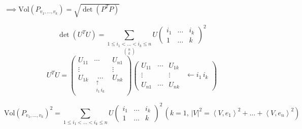 \emph{$\implies\text{Vol}\left(P_{v_1,\dots,v_k}\right)=\sqrt{\det\left(P^TP\right)}$}


\begin{theorem}
    $$\det\left(U^TU\right)=\sum_{\underset{\begin{pmatrix}n\\k\end{pmatrix}}{1\leq i_1<\dots<i_k\leq n}}U\begin{pmatrix}
            i_1 & \dots & i_k \\
            1   & \dots & k
        \end{pmatrix}^2$$
    \emph{$$U^TU=\begin{pmatrix}
                U_{11} & \cdots                       & U_{n1} \\
                \vdots &                              & \vdots \\
                U_{1k} & \underset{\substack{\uparrow          \\i_1\,i_k}}{\cdots}&U_{nk}
            \end{pmatrix}\begin{pmatrix}
                U_{11} & \cdots & U_{1k} &                     \\
                \vdots &        & \vdots & \leftarrow i_1\,i_k \\
                U_{n1} & \cdots & U_{nk} &
            \end{pmatrix}$$}
\end{theorem}

\begin{corollary}
    $$\text{Vol}\left(P_{v_1,\dots,v_k}\right)^2=\sum_{1\leq i_1<\dots<i_k\leq n}U\begin{pmatrix}
            i_1 & \dots & i_k \\
            1   & \dots & k
        \end{pmatrix}^2\,(k=1,\,|V|^2=\left\langle V,e_1\right\rangle^2+\dots+\left\langle V,e_n\right\rangle^2)$$
\end{corollary}